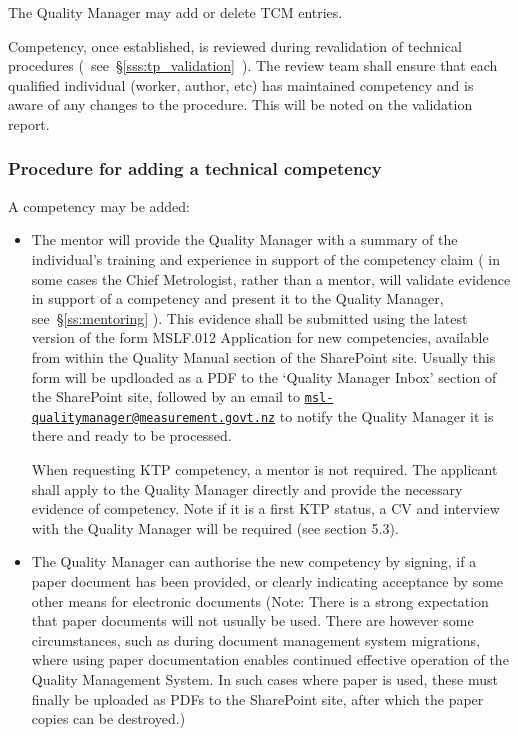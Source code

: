The Quality Manager may add or delete TCM entries. 

Competency, once established, is reviewed during revalidation of technical procedures (~see~\S\ref{sss:tp_validation}~).  The review team shall ensure that each qualified individual (worker, author, etc) has maintained competency and is aware of any changes to the procedure. This will be noted on the validation report. 

\subsubsection{Procedure for adding a technical competency}
\label{sss:tcm_procedure}
A competency may be added:
\begin{itemize}
\item The mentor will provide the Quality Manager with a summary of the individual's training and experience in support of the competency claim ( in some cases the Chief Metrologist, rather than a mentor, will validate evidence in support of a competency and present it to the Quality Manager, see~\S\ref{ss:mentoring} ). This evidence shall be submitted using the latest version of the form MSLF.012 Application for new competencies, available from within the Quality Manual section of the SharePoint site.  Usually this form will be updloaded as a PDF to the `Quality Manager Inbox' section of the SharePoint site, followed by an email to \href{mailto:msl-qualitymanager@measurement.govt.nz}{\texttt{msl-qualitymanager@measurement.govt.nz}} to notify the Quality Manager it is there and ready to be processed.

When requesting KTP competency, a mentor is not required. The applicant shall apply to the Quality Manager directly and provide the necessary evidence of competency.  Note if it is a first KTP status, a CV and interview with the Quality Manager will be required (see section 5.3).

\item The Quality Manager can authorise the new competency by signing, if a paper document has been provided, or clearly indicating acceptance by some other means for electronic documents (Note: There is a strong expectation that paper documents will not usually be used.  There are however some circumstances, such as during document management system migrations, where using paper documentation enables continued effective operation of the Quality Management System.  In such cases where paper is used, these must finally be uploaded as PDFs to the SharePoint site, after which the paper copies can be destroyed.)


\end{itemize}
